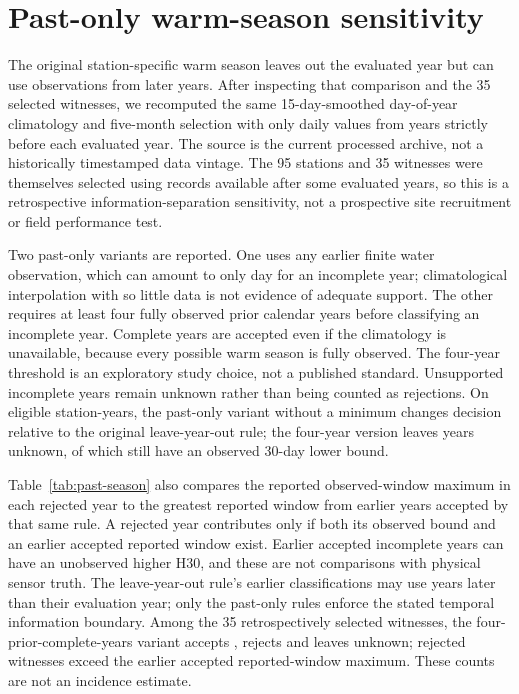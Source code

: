 \section{Past-only warm-season sensitivity}
The original station-specific warm season leaves out the evaluated year but can use observations from later years. After inspecting that comparison and the 35 selected witnesses, we recomputed the same 15-day-smoothed day-of-year climatology and five-month selection with only daily values from years strictly before each evaluated year. The source is the current processed archive, not a historically timestamped data vintage. The 95 stations and 35 witnesses were themselves selected using records available after some evaluated years, so this is a retrospective information-separation sensitivity, not a prospective site recruitment or field performance test.

Two past-only variants are reported. One uses any earlier finite water observation, which can amount to only \PWMinimumDays{} day for an incomplete year; climatological interpolation with so little data is not evidence of adequate support. The other requires at least four fully observed prior calendar years before classifying an incomplete year. Complete years are accepted even if the climatology is unavailable, because every possible warm season is fully observed. The four-year threshold is an exploratory study choice, not a published standard. Unsupported incomplete years remain unknown rather than being counted as rejections. On \PWYears{} eligible station-years, the past-only variant without a minimum changes \PWChange{} decision relative to the original leave-year-out rule; the four-year version leaves \PWUnknown{} years unknown, \PWUnknownBounds{} of which still have an observed 30-day lower bound.

Table~\ref{tab:past-season} also compares the reported observed-window maximum in each rejected year to the greatest reported window from earlier years accepted by that same rule. A rejected year contributes only if both its observed bound and an earlier accepted reported window exist. Earlier accepted incomplete years can have an unobserved higher H30, and these are not comparisons with physical sensor truth. The leave-year-out rule's earlier classifications may use years later than their evaluation year; only the past-only rules enforce the stated temporal information boundary. Among the 35 retrospectively selected witnesses, the four-prior-complete-years variant accepts \PWWitnessAccepted{}, rejects \PWWitnessRejected{} and leaves \PWWitnessUnknown{} unknown; \PWWitnessPrior{} rejected witnesses exceed the earlier accepted reported-window maximum. These counts are not an incidence estimate.

